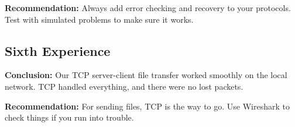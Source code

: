 \textbf{Recommendation:} Always add error checking and recovery to your
protocols. Test with simulated problems to make sure it works.

\subsection{Sixth Experience}
\textbf{Conclusion:} Our TCP server-client file transfer worked smoothly on the
local network. TCP handled everything, and there were no lost packets.

\textbf{Recommendation:} For sending files, TCP is the way to go. Use Wireshark
to check things if you run into trouble.


%
